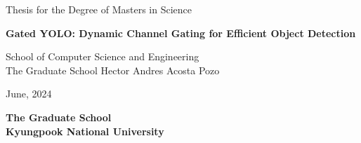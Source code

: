 \begin{titlepage}
    \begin{center}
    	\textmd{\large Thesis for the Degree of Masters in Science}  
        \vfill

        \textbf{\fontsize{21}{11}\selectfont Gated YOLO: Dynamic Channel Gating for Efficient Object Detection}  
        \vfill
        
        \textnormal{\large School of Computer Science and Engineering\\ The Graduate School          } 
        \vfill
        \textnormal{\Large Hector Andres Acosta Pozo}
        \vfill
        \vfill
        
        
        \textnormal{\large June, 2024}
        
        \textbf{\Large The Graduate School \\ Kyungpook National University}
        \vfill
    \end{center}
\end{titlepage}